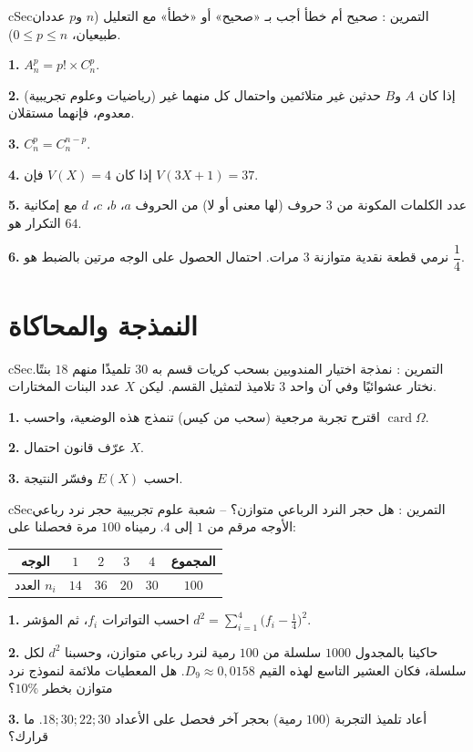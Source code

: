 \documentclass[12pt,a4paper]{article}
\newenvironment{BOX}[2]{\begin{otherlanguage}{english}\begin{arbox}{#1}{#2}}{\end{arbox}\end{otherlanguage}}
\newcounter{exo}
\newenvironment{tamrin}[1]{\stepcounter{exo}\begin{BOX}{cSec}{التمرين \theexo: #1}}{\end{BOX}}
\newcommand{\QQ}[1]{\par\smallskip\textbf{#1.} }
\begin{document}
\begin{tamrin}{صحيح أم خطأ}
أجب بـ «صحيح» أو «خطأ» مع التعليل ($n$ و$p$ عددان طبيعيان، $0\leqslant p\leqslant n$).

\textbf{1.} $A_n^p=p!\times C_n^p$.\par
\textbf{2.} (رياضيات وعلوم تجريبية) إذا كان $A$ و$B$ حدثين غير متلائمين واحتمال كل منهما غير معدوم، فإنهما مستقلان.\par
\textbf{3.} $C_n^p=C_n^{n-p}$.\par
\textbf{4.} إذا كان $V(X)=4$ فإن $V(3X+1)=37$.\par
\textbf{5.} عدد الكلمات المكونة من 3 حروف (لها معنى أو لا) من الحروف $a$، $b$، $c$، $d$ مع إمكانية التكرار هو $64$.\par
\textbf{6.} نرمي قطعة نقدية متوازنة 3 مرات. احتمال الحصول على الوجه مرتين بالضبط هو $\dfrac14$.
\end{tamrin}

\section{النمذجة والمحاكاة}

\begin{tamrin}{نمذجة اختيار المندوبين بسحب كريات}
قسم به $30$ تلميذًا منهم $18$ بنتًا. نختار عشوائيًا وفي آن واحد $3$ تلاميذ لتمثيل القسم. ليكن $X$ عدد البنات المختارات.
\QQ{1} اقترح تجربة مرجعية (سحب من كيس) تنمذج هذه الوضعية، واحسب $\operatorname{card}\Omega$.
\QQ{2} عرّف قانون احتمال $X$.
\QQ{3} احسب $E(X)$ وفسّر النتيجة.
\end{tamrin}

\begin{tamrin}{هل حجر النرد الرباعي متوازن؟ -- شعبة علوم تجريبية}
حجر نرد رباعي الأوجه مرقم من $1$ إلى $4$. رميناه $100$ مرة فحصلنا على:
\begin{center}
\begin{tabular}{|C|c|c|c|c|C|}\hline
{} الوجه & $1$ & $2$ & $3$ & $4$ & المجموع\\\hline
العدد $n_i$ & $14$ & $36$ & $20$ & $30$ & $100$\\\hline
\end{tabular}
\end{center}
\QQ{1} احسب التواترات $f_i$، ثم المؤشر $d^2=\displaystyle\sum_{i=1}^{4}\Big(f_i-\frac14\Big)^2$.
\QQ{2} حاكينا بالمجدول $1000$ سلسلة من $100$ رمية لنرد رباعي متوازن، وحسبنا $d^2$ لكل سلسلة، فكان العشير التاسع لهذه القيم $D_9\approx0{,}0158$. هل المعطيات ملائمة لنموذج نرد متوازن بخطر $10\%$؟
\QQ{3} أعاد تلميذ التجربة ($100$ رمية) بحجر آخر فحصل على الأعداد $18;30;22;30$. ما قرارك؟
\end{tamrin}
\end{document}
